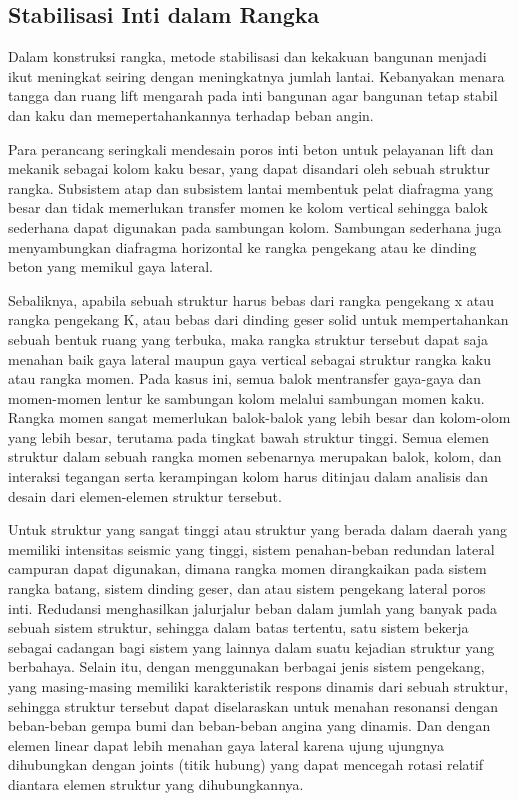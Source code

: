 \documentclass[../modul_skb.tex]{subfiles}
\begin{document}
\subsection{Stabilisasi Inti dalam Rangka}

Dalam konstruksi rangka, metode stabilisasi dan kekakuan bangunan menjadi ikut meningkat seiring dengan meningkatnya jumlah lantai. Kebanyakan menara tangga dan ruang lift mengarah pada inti bangunan agar bangunan tetap stabil dan kaku dan memepertahankannya terhadap beban angin.

Para perancang seringkali mendesain poros inti beton untuk pelayanan lift dan mekanik sebagai kolom kaku besar, yang dapat disandari oleh sebuah struktur rangka. Subsistem atap dan subsistem lantai membentuk pelat diafragma yang besar dan tidak memerlukan transfer momen ke kolom vertical sehingga balok sederhana dapat digunakan pada sambungan kolom. Sambungan sederhana juga menyambungkan diafragma horizontal ke rangka pengekang atau ke dinding beton yang memikul gaya lateral.

Sebaliknya, apabila sebuah struktur harus bebas dari rangka pengekang x atau rangka pengekang K, atau bebas dari dinding geser solid untuk mempertahankan sebuah bentuk ruang yang terbuka, maka rangka struktur tersebut dapat saja menahan baik gaya lateral maupun gaya vertical sebagai struktur rangka kaku atau rangka momen. Pada kasus ini, semua balok mentransfer gaya-gaya dan momen-momen lentur ke sambungan kolom melalui sambungan momen kaku. Rangka momen sangat memerlukan balok-balok yang lebih besar dan kolom-olom yang lebih besar, terutama pada tingkat bawah struktur tinggi. Semua elemen struktur dalam sebuah rangka momen sebenarnya merupakan balok, kolom, dan interaksi tegangan serta kerampingan kolom harus ditinjau dalam analisis dan desain dari elemen-elemen struktur tersebut.

Untuk struktur yang sangat tinggi atau struktur yang berada dalam daerah yang memiliki intensitas seismic yang tinggi, sistem penahan-beban redundan lateral campuran dapat digunakan, dimana rangka momen dirangkaikan pada sistem rangka batang, sistem dinding geser, dan atau sistem pengekang lateral poros inti. Redudansi menghasilkan jalurjalur beban dalam jumlah yang banyak pada sebuah sistem struktur, sehingga dalam batas tertentu, satu sistem bekerja sebagai cadangan bagi sistem yang lainnya dalam suatu kejadian struktur yang berbahaya. Selain itu, dengan menggunakan berbagai jenis sistem pengekang, yang masing-masing memiliki karakteristik respons dinamis dari sebuah struktur, sehingga struktur tersebut dapat diselaraskan untuk menahan resonansi dengan beban-beban gempa bumi dan beban-beban angina yang dinamis. Dan dengan elemen linear dapat lebih menahan gaya lateral karena ujung ujungnya dihubungkan dengan joints (titik hubung) yang dapat mencegah rotasi relatif diantara elemen struktur yang dihubungkannya.
\end{document}

